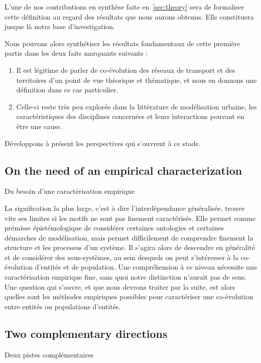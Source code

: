 L'une de nos contributions en synthèse faite en~\ref{sec:theory} sera de formaliser cette définition au regard des résultats que nous aurons obtenus. Elle constituera jusque là notre base d'investigation.


Nous pouvons alors synthétiser les résultats fondamentaux de cette première partie dans les deux faits marquants suivants :
\begin{enumerate}
	\item Il est légitime de parler de co-évolution des réseaux de transport et des territoires d'un point de vue théorique et thématique, et nous en donnons une définition dans ce cas particulier.
	\item Celle-ci reste très peu explorée dans la littérature de modélisation urbaine, les caractéristiques des disciplines concernées et leurs interactions pouvant en être une cause.
\end{enumerate}

Développons à présent les perspectives qui s'ouvrent à ce stade.


\subsection*{On the need of an empirical characterization}{Du besoin d'une caractérisation empirique}

La signification la plus large, c'est à dire l'interdépendance généralisée, trouve vite ses limites si les motifs ne sont pas finement caractérisés. Elle permet comme prémisse épistémologique de considérer certaines ontologies et certaines démarches de modélisation, mais permet difficilement de comprendre finement la structure et les processus d'un système. Il s'agira alors de descendre en généralité et de considérer des sous-systèmes, au sein desquels on peut s'intéresser à la co-évolution d'entités et de population. Une compréhension à ce niveau nécessite une caractérisation empirique fine, sans quoi notre distinction n'aurait pas de sens. Une question qui s'ouvre, et que nous devrons traiter par la suite, est alors quelles sont les méthodes empiriques possibles pour caractériser une co-évolution entre entités ou populations d'entités.


\subsection*{Two complementary directions}{Deux pistes complémentaires}




